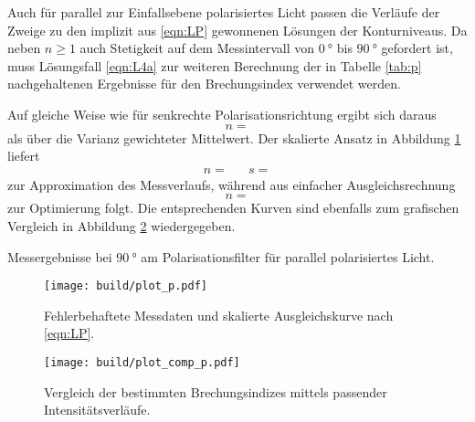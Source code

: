 Auch für parallel zur Einfallsebene polarisiertes Licht passen die Verläufe der Zweige zu den implizit aus \eqref{eqn:LP} gewonnenen
Lösungen der Konturniveaus. Da neben $n \geq 1$ auch Stetigkeit auf dem Messintervall von $\qty{0}{\degree}$ bis $\qty{90}{\degree}$
gefordert ist, muss Lösungsfall \eqref{eqn:L4a} zur weiteren Berechnung der in Tabelle \ref{tab:p} nachgehaltenen Ergebnisse für
den Brechungsindex verwendet werden.

Auf gleiche Weise wie für senkrechte Polarisationsrichtung ergibt sich daraus
\begin{equation*}
	n = 
\end{equation*}
als über die Varianz gewichteter Mittelwert. Der skalierte Ansatz in Abbildung \ref{fig:plot_p} liefert
\begin{align*}
	n =  && s = 
\end{align*}
zur Approximation des Messverlaufs, während aus einfacher Ausgleichsrechnung
\begin{equation*}
	n = 
\end{equation*}
zur Optimierung folgt. Die entsprechenden Kurven sind ebenfalls zum grafischen Vergleich in Abbildung \ref{fig:plot_comp_p} wiedergegeben.

\newpage\null\vfill
\begin{table}[H]
	\caption{Messergebnisse bei $\qty{90}{\degree}$ am Polarisationsfilter für parallel polarisiertes Licht.}
	\makebox[\textwidth]{
		\centering
		}
	\label{tab:p}
\end{table}
\vfill\null\newpage

\begin{figure}[H]
	\texttt{[image: build/plot\_p.pdf]}
	\caption{Fehlerbehaftete Messdaten und skalierte Ausgleichskurve nach \eqref{eqn:LP}.}
	\label{fig:plot_p}
\end{figure}

\begin{figure}[H]
	\texttt{[image: build/plot\_comp\_p.pdf]}
	\captionsetup{width=\linewidth}
	\caption{Vergleich der bestimmten Brechungsindizes mittels passender Intensitätsverläufe.}
	\label{fig:plot_comp_p}
\end{figure}

